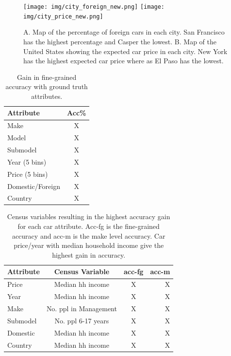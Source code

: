 \documentclass[10pt,twocolumn,letterpaper]{article}
\begin{document}
\begin{figure}[t]
\begin{center}
    \texttt{[image: img/city\_foreign\_new.png]}
    \texttt{[image: img/city\_price\_new.png]}
\end{center}
   \caption {A. Map of the percentage of foreign cars in each city. San Francisco has the highest percentage and Casper the lowest. B. Map of the United States showing the expected car price in each city. New York has the highest expected car price where as El Paso has the lowest.}
\label{fig:city_price}
\end{figure}

\begin{table}
\begin{center}
\begin{tabular}{|l|c|}
\hline
\textbf{Attribute} & \textbf{Acc\%} \\
\hline\hline
Make & X \\
Model & X \\
Submodel & X \\
Year (5 bins) & X \\
Price (5 bins)& X \\
Domestic/Foreign & X\\
Country & X\\
\hline
\end{tabular}
\end{center}
\caption{Gain in fine-grained accuracy with ground truth attributes.}
\label{table:ground}
\end{table}

\begin{table}
\begin{center}
\begin{tabular}{|l|c|c|r|}
\hline
\textbf{Attribute} & \textbf{Census Variable}& \textbf{acc-fg} &\textbf{acc-m}\\
\hline\hline
Price & Median hh income & X & X\\
Year  & Median hh income & X & X\\
Make & No. ppl in Management & X &X \\
Submodel & No. ppl 6-17 years & X & X \\
Domestic & Median hh income & X & X\\
Country & Median hh income & X & X\\
\hline
\end{tabular}
\end{center}
\caption{Census variables resulting in the highest accuracy gain for each car attribute. Acc-fg is the fine-grained accuracy and acc-m is the make level accuracy. Car price/year with median household income give the highest gain in accuracy.}
\label{table:prior-acc}
\end{table}
\end{document}
